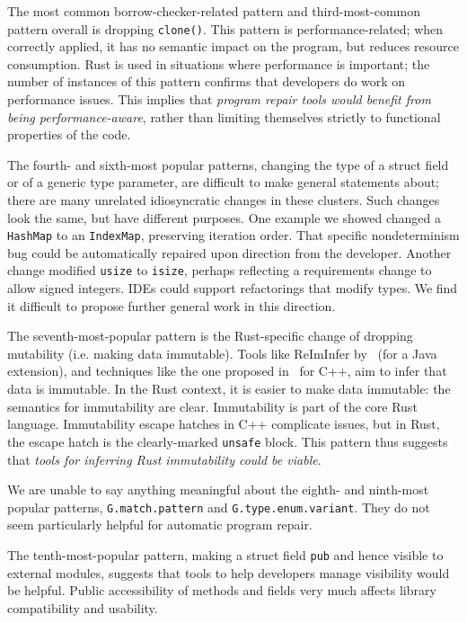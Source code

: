The most common borrow-checker-related pattern and third-most-common pattern overall is dropping \texttt{clone()}. This pattern is performance-related; when correctly applied, it has no semantic impact on the program, but reduces resource consumption. Rust is used in situations where performance is important; the number of instances of this pattern confirms that developers do work on performance issues. This implies that \emph{program repair tools would benefit from being performance-aware}, rather than limiting themselves strictly to functional properties of the code.

The fourth- and sixth-most popular patterns, changing the type of a struct field or of a generic type parameter, are difficult to make general statements about; there are many unrelated idiosyncratic changes in these clusters. Such changes look the same, but have different purposes. One example we showed changed a \texttt{HashMap} to an \texttt{IndexMap}, preserving iteration order. That specific nondeterminism bug could be automatically repaired upon direction from the developer. Another change modified \texttt{usize} to \texttt{isize}, perhaps reflecting a requirements change to allow signed integers. IDEs could support refactorings that modify types. We find it difficult to propose further general work in this direction.

The seventh-most-popular pattern is the Rust-specific change of dropping mutability (i.e. making data immutable). Tools like ReImInfer by~\cite{HuangMDE2012} (for a Java extension), and techniques like the one proposed in~\cite{EyolfsonAbstractImmutability} for C++, aim to infer that data is immutable. In the Rust context, it is easier to make data immutable: the semantics for immutability are clear. Immutability is part of the core Rust language. Immutability escape hatches in C++ complicate issues, but in Rust, the escape hatch is the clearly-marked \texttt{unsafe} block. This pattern thus suggests that \emph{tools for inferring Rust immutability could be viable}.

We are unable to say anything meaningful about the eighth- and ninth-most popular patterns, \texttt{G.match.pattern} and \texttt{G.type.enum.variant}. They do not seem particularly helpful for automatic program repair.

The tenth-most-popular pattern, making a struct field \texttt{pub} and hence visible to external modules, suggests that tools to help developers manage visibility would be helpful. Public accessibility of methods and fields very much affects library compatibility and usability.

